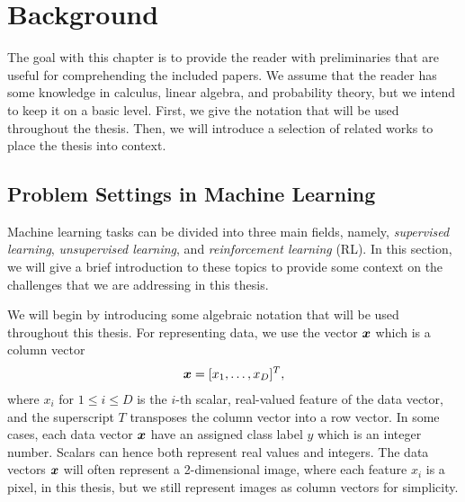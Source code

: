 
\chapter{Background}
\label{chap2}

The goal with this chapter is to provide the reader with preliminaries that are useful for comprehending the included papers. We assume that the reader has some knowledge in calculus, linear algebra, and probability theory, but we intend to keep it on a basic level. First, we give the notation that will be used throughout the thesis. Then, we will introduce a selection of related works to place the thesis into context. 




\section{Problem Settings in Machine Learning}%

Machine learning tasks can be divided into three main fields, namely, \textit{supervised learning}, \textit{unsupervised learning}, and \textit{reinforcement learning} (RL). In this section, we will give a brief introduction to these topics to provide some context on the challenges that we are addressing in this thesis. 

We will begin by introducing some algebraic notation that will be used throughout this thesis. For representing data, we use the vector ${\bm{x}}$ which is a column vector 
\begin{align*}
	{\bm{x}} = [x_1, \dots, x_D]^T,
\end{align*}
where $x_i$ for $1 \leq i \leq D$ is the $i$-th scalar, real-valued feature of the data vector, and the superscript $T$ transposes the column vector into a row vector. In some cases, each data vector ${\bm{x}}$ have an assigned class label $y$ which is an integer number. Scalars can hence both represent real values and integers. The data vectors ${\bm{x}}$ will often represent a 2-dimensional image, where each feature $x_i$ is a pixel, in this thesis, but we still represent images as column vectors for simplicity. 

